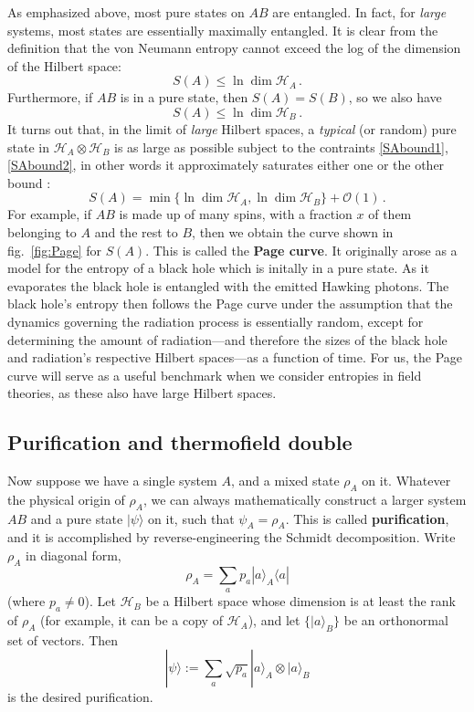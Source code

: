 \documentclass[11pt]{article}
\newcommand{\ket}[1]{|{#1}\rangle}
\newcommand{\bra}[1]{\langle{#1}|}
\newcommand{\HH}{\mathcal{H}}
\begin{document}
As emphasized above, most pure states on $AB$ are entangled. In fact, for \emph{large} systems, most states are essentially maximally entangled. It is clear from the definition that the von Neumann entropy cannot exceed the log of the dimension of the Hilbert space:
\begin{equation}\label{SAbound1}
S(A) \le \ln\dim\HH_A\,.
\end{equation}
Furthermore, if $AB$ is in a pure state, then $S(A)=S(B)$, so we also have
\begin{equation}\label{SAbound2}
S(A) \le \ln\dim\HH_B\,.
\end{equation}
It turns out that, in the limit of \emph{large} Hilbert spaces, a \emph{typical} (or random) pure state in $\HH_A\otimes\HH_B$ is as large as possible subject to the contraints \eqref{SAbound1}, \eqref{SAbound2}, in other words it approximately saturates either one or the other bound \cite{Page:1993wv}:
\begin{equation}\label{page}
S(A) = \min\{\ln\dim\HH_A,\ln\dim\HH_B\} + \mathcal{O}(1)\,.
\end{equation}
For example, if $AB$ is made up of many spins, with a fraction $x$ of them belonging to $A$ and the rest to $B$, then we obtain the curve shown in fig.\ \ref{fig:Page} for $S(A)$. This is called the \textbf{Page curve}. It originally arose as a model for the entropy of a black hole which is initally in a pure state. As it evaporates the black hole is entangled with the emitted Hawking photons. The black hole's entropy then follows the Page curve under the assumption that the dynamics governing the radiation process is essentially random, except for determining the amount of radiation---and therefore the sizes of the black hole and radiation's respective Hilbert spaces---as a function of time. For us, the Page curve will serve as a useful benchmark when we consider entropies in field theories, as these also have large Hilbert spaces.




\subsection{Purification and thermofield double}
\label{sec:purification}

Now suppose we have a single system $A$, and a mixed state $\rho_A$ on it. Whatever the physical origin of $\rho_A$, we can always mathematically construct a larger system $AB$ and a pure state $\ket{\psi}$ on it, such that $\psi_A=\rho_A$. This is called \textbf{purification}, and it is accomplished by reverse-engineering the Schmidt decomposition. Write $\rho_A$ in diagonal form,
\begin{equation}
\rho_A = \sum_a p_a\ket{a}_A\bra{a}
\end{equation}
(where $p_a\neq0$). Let $\HH_B$ be a Hilbert space whose dimension is at least the rank of $\rho_A$ (for example, it can be a copy of $\HH_A$), and let $\{\ket{a}_B\}$ be an orthonormal set of vectors. Then
\begin{equation}
\ket{\psi} := \sum_a\sqrt{p_a}\ket{a}_A\otimes\ket{a}_B
\end{equation}
is the desired purification.
\end{document}
